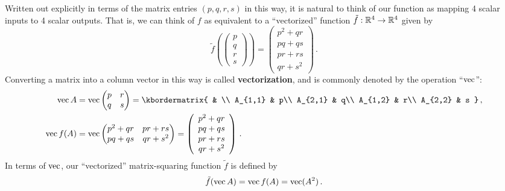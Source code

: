 Written out explicitly in terms of the matrix entries $(p,q,r,s)$
in this way, it is natural to think of our function as mapping 4
scalar inputs to 4 scalar outputs. That is, we can think of $f$
as equivalent to a ``vectorized'' function $\tilde{f}:\mathbb R^{4}\to\mathbb R^{4}$
given by 
\[
\tilde{f}(\left(\begin{array}{c}
p\\
q\\
r\\
s
\end{array}\right))=\left(\begin{array}{c}
p^{2}+qr\\
pq+qs\\
pr+rs\\
qr+s^{2}
\end{array}\right)\,.
\]
Converting a matrix into a column vector in this way is called \textbf{vectorization},
and is commonly denoted by the operation ``$\operatorname{vec}$'':
\begin{align*}
\vecm A & =\vecm\begin{pmatrix}p & r\\
q & s
\end{pmatrix}=\kbordermatrix{ & \\
A_{1,1} & p\\
A_{2,1} & q\\
A_{1,2} & r\\
A_{2,2} & s
} \, ,\\
\vecm f(A) & =\vecm\begin{pmatrix}p^{2}+qr & pr+rs\\
pq+qs & qr+s^{2}
\end{pmatrix}=\left(\begin{array}{c}
p^{2}+qr\\
pq+qs\\
pr+rs\\
qr+s^{2}
\end{array}\right) \, .
\end{align*}
In terms of $\operatorname{vec}$, our ``vectorized'' matrix-squaring function
$\tilde{f}$ is defined by 
\[
\tilde{f}(\operatorname{vec} A)=\operatorname{vec} f(A)=\operatorname{vec}(A^{2})\,.
\]

